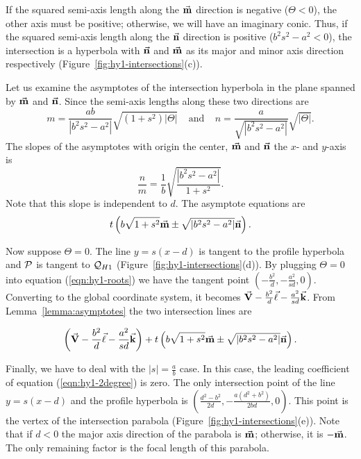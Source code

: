      If the squared semi-axis length along the $\vec{\bf m}$ direction is 
negative ($\Theta<0$), the other axis must be positive; otherwise, we will 
have an imaginary conic.  Thus, if the squared semi-axis length along the 
$\vec{\bf n}$ direction is positive ($b^2s^2-a^2<0$), the intersection is a 
hyperbola with $\vec{\bf n}$ and $\vec{\bf m}$ as its major and minor axis 
direction respectively (Figure~\ref{fig:hy1-intersections}(c)).

     Let us examine the asymptotes of the intersection hyperbola in the plane
spanned by $\vec{\bf m}$ and $\vec{\bf n}$.  Since the semi-axis lengths along 
these two directions are 
\[ m=\frac{ab}{|b^2s^2-a^2|}\sqrt{(1+s^2)|\Theta|}\ \ \ \ \ \mbox{and}\ \ \ \ \ 
   n=\frac{a}{\sqrt{|b^2s^2-a^2|}}\sqrt{|\Theta|}. \]
The slopes of the asymptotes with origin the center, $\vec{\bf m}$
and $\vec{\bf n}$ the $x$- and $y$-axis is
\[ \frac{n}{m} = \frac{1}{b}\sqrt{\frac{|b^2s^2-a^2|}{1+s^2}}. \]
Note that this slope is independent to $d$.  The asymptote equations are
\[ t\left(b\sqrt{1+s^2}\vec{\bf m}\pm\sqrt{|b^2s^2-a^2|}\vec{\bf n}\right). \]

     Now suppose $\Theta=0$.  The line $y=s(x-d)$ is tangent to the profile 
hyperbola and  ${\cal P}$ is tangent to ${\cal Q}_{H1}$
(Figure~\ref{fig:hy1-intersections}(d)).  By plugging $\Theta=0$ into equation
(\ref{eqn:hy1-roots}) we have the tangent point 
$\left(-\frac{b^2}{d},-\frac{a^2}{sd},0\right)$.  Converting to the global
coordinate system, it becomes $\vec{\bf V}-\frac{b^2}{d}\vec{\bf \ell}-
\frac{a^2}{sd}\vec{\bf k}$.  From Lemma~\ref{lemma:asymptotes} the two 
intersection lines are

\[ \left(\vec{\bf V}-\frac{b^2}{d}\vec{\bf \ell}-\frac{a^2}{sd}\vec{\bf k}\right)
     +t\left(b\sqrt{1+s^2}\vec{\bf m}\pm\sqrt{|b^2s^2-a^2|}\vec{\bf n}\right). \]

     Finally, we have to deal with the $|s|=\frac{a}{b}$ case.  In this case,
the leading coefficient of equation (\ref{eqn:hy1-2degree}) is zero.  The 
only intersection point of the line $y=s(x-d)$ and the profile hyperbola is
$\left(\frac{d^2-b^2}{2d},-\frac{a(d^2+b^2)}{2bd},0\right)$.  This point is the
vertex of the intersection parabola (Figure~\ref{fig:hy1-intersections}(e)).
Note that if $d<0$ the major axis direction of the parabola is $\vec{\bf m}$; 
otherwise, it is $-\vec{\bf m}$.  The only remaining factor is the focal length 
of this parabola.

